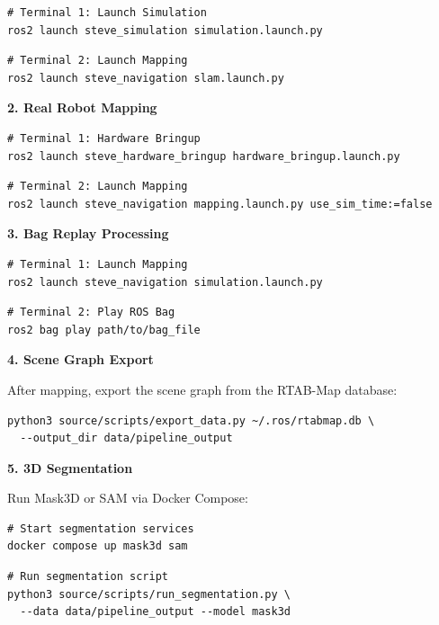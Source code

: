 \documentclass[12pt,oneside,a4paper]{article}
\begin{document}
\begin{lstlisting}[style=bashstyle]
# Terminal 1: Launch Simulation
ros2 launch steve_simulation simulation.launch.py
\end{lstlisting}

\begin{lstlisting}[style=bashstyle]
# Terminal 2: Launch Mapping
ros2 launch steve_navigation slam.launch.py
\end{lstlisting}

\textbf{2. Real Robot Mapping}

\begin{lstlisting}[style=bashstyle]
# Terminal 1: Hardware Bringup
ros2 launch steve_hardware_bringup hardware_bringup.launch.py
\end{lstlisting}

\begin{lstlisting}[style=bashstyle]
# Terminal 2: Launch Mapping 
ros2 launch steve_navigation mapping.launch.py use_sim_time:=false
\end{lstlisting}

\textbf{3. Bag Replay Processing}

\begin{lstlisting}[style=bashstyle]
# Terminal 1: Launch Mapping
ros2 launch steve_navigation simulation.launch.py 
\end{lstlisting}

\begin{lstlisting}[style=bashstyle]
# Terminal 2: Play ROS Bag
ros2 bag play path/to/bag_file
\end{lstlisting}

\textbf{4. Scene Graph Export}

After mapping, export the scene graph from the RTAB-Map database:

\begin{lstlisting}[style=bashstyle]
python3 source/scripts/export_data.py ~/.ros/rtabmap.db \
  --output_dir data/pipeline_output
\end{lstlisting}

\textbf{5. 3D Segmentation}

Run Mask3D or SAM via Docker Compose:

\begin{lstlisting}[style=bashstyle]
# Start segmentation services
docker compose up mask3d sam
\end{lstlisting}

\begin{lstlisting}[style=bashstyle]
# Run segmentation script
python3 source/scripts/run_segmentation.py \
  --data data/pipeline_output --model mask3d
\end{lstlisting}
\end{document}
